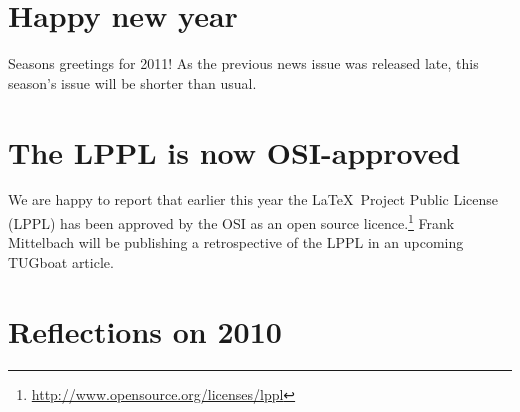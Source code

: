 \documentclass{ltnews}
\begin{document}
\maketitle

\section{Happy new year}

Seasons greetings for 2011!
As the previous news issue was released late, this season's issue will be shorter than usual.

\section{The LPPL is now OSI-approved}

We are happy to report that earlier this year the \LaTeX\ Project Public License (LPPL) has been approved by the OSI as an open source licence.\footnote{\url{http://www.opensource.org/licenses/lppl}} Frank Mittelbach will be publishing a retrospective of the LPPL in an upcoming TUGboat article.

\section{Reflections on 2010}
\end{document}
